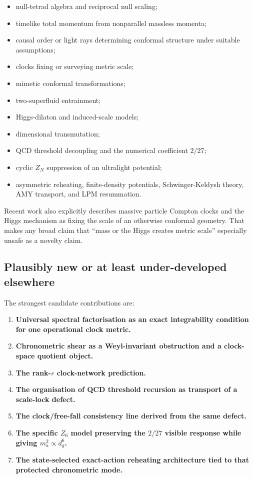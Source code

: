 \documentclass[
  10pt,
]{article}
\providecommand{\tightlist}{%
  \setlength{\itemsep}{0pt}\setlength{\parskip}{0pt}}
\begin{document}
\begin{itemize}
\tightlist
\item
  null-tetrad algebra and reciprocal null scaling;
\item
  timelike total momentum from nonparallel massless momenta;
\item
  causal order or light rays determining conformal structure under
  suitable assumptions;
\item
  clocks fixing or surveying metric scale;
\item
  mimetic conformal transformations;
\item
  two-superfluid entrainment;
\item
  Higgs-dilaton and induced-scale models;
\item
  dimensional transmutation;
\item
  QCD threshold decoupling and the numerical coefficient \(2/27\);
\item
  cyclic \(Z_N\) suppression of an ultralight potential;
\item
  asymmetric reheating, finite-density potentials, Schwinger-Keldysh
  theory, AMY transport, and LPM resummation.
\end{itemize}

Recent work also explicitly describes massive particle Compton clocks
and the Higgs mechanism as fixing the scale of an otherwise conformal
geometry. That makes any broad claim that ``mass or the Higgs creates
metric scale'' especially unsafe as a novelty claim.

\subsection{Plausibly new or at least under-developed
elsewhere}\label{plausibly-new-or-at-least-under-developed-elsewhere}

The strongest candidate contributions are:

\begin{enumerate}
\def\labelenumi{\arabic{enumi}.}
\tightlist
\item
  \textbf{Universal spectral factorisation as an exact integrability
  condition for one operational clock metric.}
\item
  \textbf{Chronometric shear as a Weyl-invariant obstruction and a
  clock-space quotient object.}
\item
  \textbf{The rank-\(r\) clock-network prediction.}
\item
  \textbf{The organisation of QCD threshold recursion as transport of a
  scale-lock defect.}
\item
  \textbf{The clock/free-fall consistency line derived from the same
  defect.}
\item
  \textbf{The specific \(Z_6\) model preserving the \(2/27\) visible
  response while giving \(m_a^2\propto d_g^6\).}
\item
  \textbf{The state-selected exact-action reheating architecture tied to
  that protected chronometric mode.}
\end{enumerate}
\end{document}
